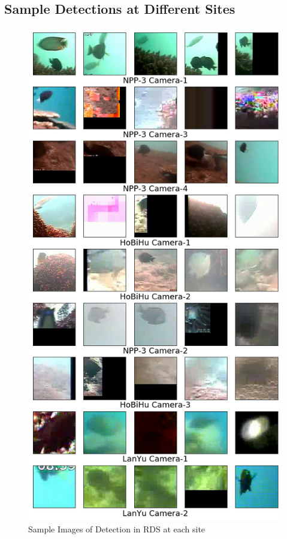 \documentclass[bsc,logo,twoside,fullspacing,parskip]{infthesis}
\begin{document}
\subsection{Sample Detections at Different Sites}

\begin{figure}[h]
    \centering
    \includegraphics[scale=0.4]{graph/samplesite2.png}
    \caption{Sample Images of Detection in RDS at each site}
    \label{fig:samplesite}
\end{figure}
\end{document}
